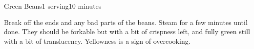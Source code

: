 \documentclass[../Cookbook.tex]{subfiles}
\begin{document}
\begin{recipe}[GreenBeans]{Green Beans}{1 serving}{10 minutes}

  Break off the ends and any bad parts of the beans.
  Steam for a few minutes until done. They should be forkable but with a bit of crispness left, and fully green still with a bit of translucency. Yellowness is a sign of overcooking.

\end{recipe}
\end{document}
